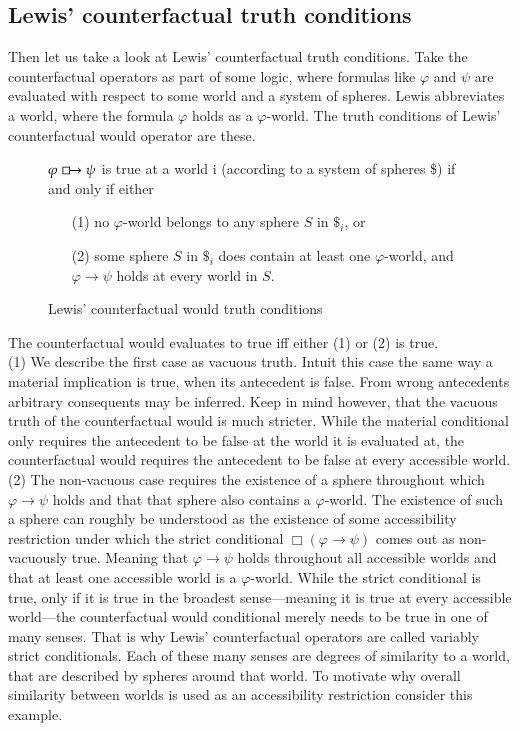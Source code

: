 \documentclass[a4paper,american,10pt]{paper}
\theoremstyle{definition}\newtheorem{definition}{Definition}
\begin{document}
\subsection{Lewis' counterfactual truth conditions}
Then let us take a look at Lewis' counterfactual truth conditions. Take the counterfactual operators as part of some logic, where formulas like $\varphi$ and $\psi$ are evaluated with respect to some world and a system of spheres. Lewis abbreviates a world, where the formula $\varphi$ holds as a $\varphi$-world. The truth conditions of Lewis' counterfactual would operator are these.
\begin{figure}[H]
	\centering
	$\varphi\boxright\psi$ is true at a world i (according to a system of spheres \$) if and only if either
	\begin{itemize}
	\item[(1)] no $\varphi$-world belongs to any sphere $S$ in $\$_i$, or
	\item[(2)] some sphere $S$ in $\$_i$ does contain at least one $\varphi$-world, and $\varphi\rightarrow\psi$ holds at every world in $S$.
	\end{itemize}
	\caption{Lewis' counterfactual would truth conditions}
	\label{fig:counterfactual_would}
\end{figure}
\noindent The counterfactual would evaluates to true iff either (1) or (2) is true.\\
\indent (1) We describe the first case as vacuous truth. Intuit this case the same way a material implication is true, when its antecedent is false. From wrong antecedents arbitrary consequents may be inferred. Keep in mind however, that the vacuous truth of the counterfactual would is much stricter. While the material conditional only requires the antecedent to be false at the world it is evaluated at, the counterfactual would requires the antecedent to be false at every accessible world.\\
\indent (2) The non-vacuous case requires the existence of a sphere throughout which $\varphi\rightarrow\psi$ holds and that that sphere also contains a $\varphi$-world. The existence of such a sphere can roughly be understood as the existence of some accessibility restriction under which the strict conditional $\Box (\varphi\rightarrow\psi)$ comes out as non-vacuously true. Meaning that $\varphi\rightarrow\psi$ holds throughout all accessible worlds and that at least one accessible world is a $\varphi$-world. While the strict conditional is true, only if it is true in the broadest sense---meaning it is true at every accessible world---the counterfactual would conditional merely needs to be true in one of many senses. That is why Lewis' counterfactual operators are called variably strict conditionals. Each of these many senses are degrees of similarity to a world, that are described by spheres around that world. To motivate why overall similarity between worlds is used as an accessibility restriction consider this example.
\end{document}
